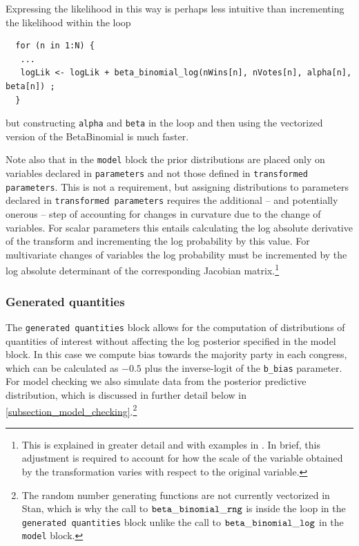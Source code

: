 \noindent Expressing the likelihood in this way is perhaps less intuitive than incrementing the likelihood within the loop

\begin{singlespacing}
\small
\begin{verbatim}
  for (n in 1:N) {
   ...
   logLik <- logLik + beta_binomial_log(nWins[n], nVotes[n], alpha[n], beta[n]) ;
  }
\end{verbatim}
\end{singlespacing}
%
\noindent but constructing {\tt alpha} and {\tt beta} in the loop and then using the vectorized version of the BetaBinomial is much faster. 

Note also that in the {\tt model} block the prior distributions are placed only on variables declared in {\tt parameters}  and not those defined in {\tt transformed parameters}. This is not a requirement, but assigning distributions to parameters declared in {\tt transformed parameters} requires the additional -- and potentially onerous -- step of accounting for changes in curvature due to the change of variables. For scalar parameters this entails calculating the log absolute derivative of the transform and incrementing the log probability by this value. For multivariate changes of variables the log probability must be incremented by the log absolute determinant of the corresponding Jacobian matrix.\footnote{This is explained in greater detail and with examples in . In brief, this adjustment is required to account for how the scale of the variable obtained by the transformation varies with respect to the original variable.}




\subsubsection{Generated quantities}

The {\tt generated quantities} block allows for the computation of distributions of quantities of interest without affecting the log posterior specified in the model block. In this case we compute bias towards the majority party in each congress, which can be calculated as $-0.5$ plus the inverse-logit of the {\tt b\_bias} parameter. For model checking we also simulate data from the posterior predictive distribution, which is discussed in further detail below in \ref{subsection_model_checking}.\footnote{The random number generating functions are not currently vectorized in Stan, which is why the call to ${\tt beta\_binomial\_rng}$ is inside the loop in the {\tt generated quantities} block unlike the call to ${\tt beta\_binomial\_log}$ in the {\tt model} block.} 

